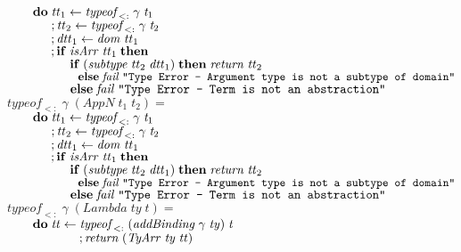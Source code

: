 \documentclass[10pt]{article}
\newcommand{\Conid}[1]{\mathit{#1}}
\newcommand{\Varid}[1]{\mathit{#1}}
\begin{document}
\begin{tabbing}
${\hskip2.00em\relax\mathbf{do}\;\Varid{tt}_1\leftarrow \Varid{typeof}_{<:}\;\Varid{\gamma}\;\Varid{t}_1}$\\
${\hskip2.00em\relax\phantom{\mathbf{do}\;\mbox{}};\Varid{tt}_2\leftarrow \Varid{typeof}_{<:}\;\Varid{\gamma}\;\Varid{t}_2}$\\
${\hskip2.00em\relax\phantom{\mathbf{do}\;\mbox{}};\Varid{dtt}_1\leftarrow \Varid{dom}\;\Varid{tt}_1}$\\
${\hskip2.00em\relax\phantom{\mathbf{do}\;\mbox{}};\mathbf{if}\;\Varid{isArr}\;\Varid{tt}_1\;\mathbf{then}}$\\
${\hskip2.00em\relax\phantom{\mathbf{do}\;\mbox{}}\phantom{;\mathbf{if}\;\mbox{}}\mathbf{if}\;(\Varid{subtype}\;\Varid{tt}_2\;\Varid{dtt}_1)\;\mathbf{then}\;\Varid{return}\;\Varid{tt}_2}$\\
${\hskip2.00em\relax\phantom{\mathbf{do}\;\mbox{}}\phantom{;\mathbf{if}\;\mbox{}}\phantom{\mathbf{if}\;\mbox{}}\mathbf{else}\;\Varid{fail}\;\text{\tt \char34 Type~Error~-~Argument~type~is~not~a~subtype~of~domain\char34}}$\\
${\hskip2.00em\relax\phantom{\mathbf{do}\;\mbox{}}\hskip1.50em\relax\mathbf{else}\;\Varid{fail}\;\text{\tt \char34 Type~Error~-~Term~is~not~an~abstraction\char34}}$\\
${\Varid{typeof}_{<:}\;\Varid{\gamma}\;(\Conid{AppN}\;\Varid{t}_1\;\Varid{t}_2)\mathrel{=}}$\\
${\hskip2.00em\relax\mathbf{do}\;\Varid{tt}_1\leftarrow \Varid{typeof}_{<:}\;\Varid{\gamma}\;\Varid{t}_1}$\\
${\hskip2.00em\relax\phantom{\mathbf{do}\;\mbox{}};\Varid{tt}_2\leftarrow \Varid{typeof}_{<:}\;\Varid{\gamma}\;\Varid{t}_2}$\\
${\hskip2.00em\relax\phantom{\mathbf{do}\;\mbox{}};\Varid{dtt}_1\leftarrow \Varid{dom}\;\Varid{tt}_1}$\\
${\hskip2.00em\relax\phantom{\mathbf{do}\;\mbox{}};\mathbf{if}\;\Varid{isArr}\;\Varid{tt}_1\;\mathbf{then}}$\\
${\hskip2.00em\relax\phantom{\mathbf{do}\;\mbox{}}\phantom{;\mathbf{if}\;\mbox{}}\mathbf{if}\;(\Varid{subtype}\;\Varid{tt}_2\;\Varid{dtt}_1)\;\mathbf{then}\;\Varid{return}\;\Varid{tt}_2}$\\
${\hskip2.00em\relax\phantom{\mathbf{do}\;\mbox{}}\phantom{;\mathbf{if}\;\mbox{}}\phantom{\mathbf{if}\;\mbox{}}\mathbf{else}\;\Varid{fail}\;\text{\tt \char34 Type~Error~-~Argument~type~is~not~a~subtype~of~domain\char34}}$\\
${\hskip2.00em\relax\phantom{\mathbf{do}\;\mbox{}}\hskip1.50em\relax\mathbf{else}\;\Varid{fail}\;\text{\tt \char34 Type~Error~-~Term~is~not~an~abstraction\char34}}$\\
${\Varid{typeof}_{<:}\;\Varid{\gamma}\;(\Conid{Lambda}\;\Varid{ty}\;\Varid{t})\mathrel{=}}$\\
${\hskip2.00em\relax\mathbf{do}\;\Varid{tt}\leftarrow \Varid{typeof}_{<:}\;(\Varid{addBinding}\;\Varid{\gamma}\;\Varid{ty})\;\Varid{t}}$\\
${\hskip2.00em\relax\phantom{\mathbf{do}\;\Varid{tt}\leftarrow \mbox{}};\Varid{return}\;(\Conid{TyArr}\;\Varid{ty}\;\Varid{tt})}$
\end{tabbing}
\end{document}
